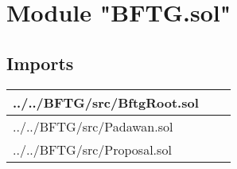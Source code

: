 
\section{Module "BFTG.sol"}


\subsection{Imports}


\noindent\begin{tabular}{|l|l|p{5cm}|}\hline
../../BFTG/src/BftgRoot.sol &\\\hline
../../BFTG/src/Padawan.sol &\\\hline
../../BFTG/src/Proposal.sol &\\\hline
\end{tabular}

